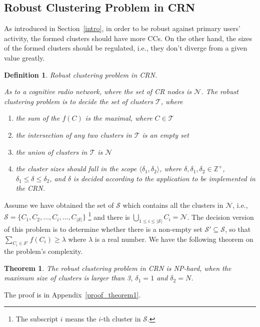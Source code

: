 \documentclass[times]{ettauth}
\newcommand{\ie}{i.e., }
\theoremstyle{mytheoremstyle}
\newtheorem{theorem}{Theorem}[section]
\theoremstyle{mytheoremstyle}
\theoremstyle{mytheoremstyle}
\newtheorem{mydef}{Definition}
\begin{document}
\subsection{Robust Clustering Problem in CRN}
\label{problem}

As introduced in Section~\ref{intro}, in order to be robust against primary users' activity, the formed clusters should have more CCs.
On the other hand, the sizes of the formed clusters should be regulated, \ie they don't diverge from a given value greatly.



\begin{mydef}
\label{def_centralized_clustering}
\textit{Robust clustering problem in CRN.}

As to a cognitive radio network, where the set of CR nodes is $\mathcal{N}$.
The robust clustering problem is to decide the set of clusters $\mathcal{T}$, where 
\begin{enumerate}
\setlength{\itemindent}{.05in}
\item the sum of the $f(C)$ is the maximal, where $C\in \mathcal{T}$ 
\item the intersection of any two clusters in $\mathcal{T}$ is an empty set
\item the union of clusters in $\mathcal{T}$ is $\mathcal{N}$
\item the cluster sizes should fall in the scope $\langle\delta_1, \delta_2\rangle$, where $\delta, \delta_1, \delta_2\in \mathbb{Z}^+$, $\delta_1 \leq \delta\leq \delta_2$, and $\delta$ is decided according to the application to be implemented in the CRN.
\end{enumerate}

\end{mydef}

Assume we have obtained the set of $\mathcal{S}$ which contains all the clusters in $\mathcal{N}$, \ie $\mathcal{S}=\{C_1, C_2,\ldots,C_i, \ldots, C_{|\mathcal{S}|}\}$ \footnote{The subscript $i$ means the $i$-th cluster in $\mathcal{S}$.} and there is $\bigcup_{1\leq i \leq |\mathcal{S}|} C_i = \mathcal{N}$.
The decision version of this problem is to determine whether there is a non-empty set $\mathcal{S}'\subseteq \mathcal{S}$, so that $\sum_{C_i\in \mathcal{S}'} f(C_i) \geqslant \lambda$ where $\lambda$ is a real number.
We have the following theorem on the problem's complexity.
\begin{theorem}
\label{theorem1}
The robust clustering problem in CRN is NP-hard, when the maximum size of clusters is larger than 3, $\delta_1=1$ and $\delta_2 = N$.
\end{theorem}
The proof is in Appendix~\ref{proof_theorem1}.
\end{document}
